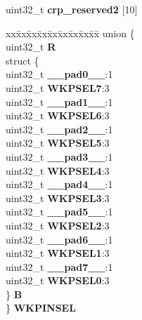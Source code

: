\begin{DoxyCompactItemize}
\begin{tabbing}
\end{tabbing}\item 
\mbox{\label{structCRP__tag_ae9c92e2d697b4543d836e547bfdfa4e4}} 
uint32\+\_\+t {\bfseries crp\+\_\+reserved2} \mbox{[}10\mbox{]}
\item 
\mbox{\label{structCRP__tag_add70628922167cb3742858fc3091b362}} 
\begin{tabbing}
xx\=xx\=xx\=xx\=xx\=xx\=xx\=xx\=xx\=\kill
union \{\\
\>uint32\_t {\bfseries R}\\
\>struct \{\\
\>\>uint32\_t {\bfseries \_\_pad0\_\_}:1\\
\>\>uint32\_t {\bfseries WKPSEL7}:3\\
\>\>uint32\_t {\bfseries \_\_pad1\_\_}:1\\
\>\>uint32\_t {\bfseries WKPSEL6}:3\\
\>\>uint32\_t {\bfseries \_\_pad2\_\_}:1\\
\>\>uint32\_t {\bfseries WKPSEL5}:3\\
\>\>uint32\_t {\bfseries \_\_pad3\_\_}:1\\
\>\>uint32\_t {\bfseries WKPSEL4}:3\\
\>\>uint32\_t {\bfseries \_\_pad4\_\_}:1\\
\>\>uint32\_t {\bfseries WKPSEL3}:3\\
\>\>uint32\_t {\bfseries \_\_pad5\_\_}:1\\
\>\>uint32\_t {\bfseries WKPSEL2}:3\\
\>\>uint32\_t {\bfseries \_\_pad6\_\_}:1\\
\>\>uint32\_t {\bfseries WKPSEL1}:3\\
\>\>uint32\_t {\bfseries \_\_pad7\_\_}:1\\
\>\>uint32\_t {\bfseries WKPSEL0}:3\\
\>\} {\bfseries B}\\
\} {\bfseries WKPINSEL}\\


\end{tabbing}
\end{DoxyCompactItemize}
